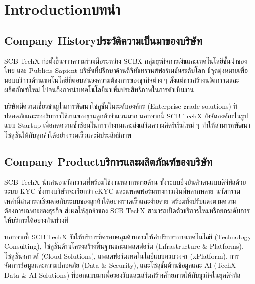 \chapter{\ifenglish Introduction\else บทนำ\fi}

\section{\ifenglish Company History\else ประวัติความเป็นมาของบริษัท\fi}

SCB TechX \cite{techxWebsite} ก่อตั้งขึ้นจากความร่วมมือระหว่าง SCBX กลุ่มธุรกิจการเงินและเทคโนโลยีชั้นนำของไทย และ Publicis Sapient บริษัทที่ปรึกษาด้านดิจิทัลทรานส์ฟอร์เมชันระดับโลก มีจุดมุ่งหมายเพื่อมอบบริการด้านเทคโนโลยีที่ตอบสนองความต้องการของธุรกิจต่าง ๆ ตั้งแต่การสร้างนวัตกรรมและผลิตภัณฑ์ใหม่ ไปจนถึงการนำเทคโนโลยีมาเพิ่มประสิทธิภาพในการดำเนินงาน

บริษัทมีความเชี่ยวชาญในการพัฒนาโซลูชันในระดับองค์กร (Enterprise-grade solutions) ที่ปลอดภัยและรองรับการใช้งานของฐานลูกค้าจำนวนมาก นอกจากนี้ SCB TechX ยังจัดองค์กรในรูปแบบ Startup เพื่อลดความซ้ำซ้อนในการทำงานและส่งเสริมความคิดริเริ่มใหม่ ๆ ทำให้สามารถพัฒนาโซลูชันให้กับลูกค้าได้อย่างรวดเร็วและมีประสิทธิภาพ


\section{\ifenglish Company Product\else บริการและผลิตภัณฑ์ของบริษัท\fi}
SCB TechX นำเสนอนวัตกรรมที่พร้อมใช้งานหลากหลายด้าน \cite{techxProduct} ทั้งระบบยืนยันตัวตนแบบดิจิทัลด้วยระบบ KYC \cite{whatIsKYC} ซึ่งทางบริษัทจะเรียกว่า eKYC และแพลตฟอร์มทางการเงินที่หลากหลาย นวัตกรรมเหล่านี้สามารถเชื่อมต่อกับระบบของลูกค้าได้อย่างรวดเร็วและง่ายดาย พร้อมทั้งปรับแต่งตามความต้องการเฉพาะของธุรกิจ ส่งผลให้ลูกค้าของ SCB TechX สามารถเปิดตัวบริการใหม่หรือยกระดับการให้บริการได้อย่างทันท่วงที

นอกจากนี้ SCB TechX ยังให้บริการที่ครอบคลุมด้านการให้คำปรึกษาทางเทคโนโลยี (Technology Consulting), โซลูชันด้านโครงสร้างพื้นฐานและแพลตฟอร์ม (Infrastructure \& Platforms), โซลูชันคลาวด์ (Cloud Solutions), แพลตฟอร์มเทคโนโลยีแบบครบวงจร (xPlatform), การจัดการข้อมูลและความปลอดภัย (Data \& Security), และโซลูชันด้านข้อมูลและ AI (TechX Data \& AI Solutions) ที่ออกแบบมาเพื่อรองรับและเสริมสร้างศักยภาพให้กับธุรกิจในยุคดิจิทัล

\clearpage

